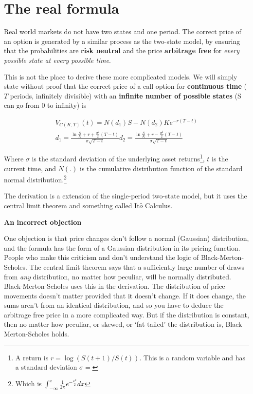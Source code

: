 \section{The real formula}

Real world markets do not have two states and one period. The correct price of an option is generated by a similar process as the two-state model, by ensuring that the probabilities are \textbf{risk neutral} and the price \textbf{arbitrage free} for \textit{every possible state at every possible time}. 

This is not the place to derive these more complicated models. We will simply state without proof that the correct price of a call option for \textbf{continuous time} ($T$ periods, infinitely divisible) with an \textbf{infinite number of possible states} (S can go from 0 to infinity) is

\begin{eqnarray}
V_{C(K,T)}(t) = N(d_1)S - N(d_2)Ke^{-r(T-t)}\\
d_1 = \frac{\ln \frac{S}{K} + r+\frac{\sigma^2}{2}(T-t)}{\sigma \sqrt{T-t}}
d_2 = \frac{\ln \frac{S}{K} + r-\frac{\sigma^2}{2}(T-t)}{\sigma \sqrt{T-t}}
\end{eqnarray}

Where $\sigma$ is the standard deviation of the underlying asset returns\footnote{A return is $r=\log(S(t+1)/S(t))$. This is a random variable and has a standard deviation $\sigma = $}, $t$ is the current time, and $N(.)$ is the cumulative distribution function of the standard normal distribution.\footnote{Which is $\int_{-\infty}^x \frac{1}{2\pi}e^{-\frac{x^2}{2}}dx$}
 
The derivation is a extension of the single-period two-state model, but it uses the central limit theorem and something called It$\hat{o}$ Calculus. 


\textbf{An incorrect objection}

One objection is that price changes don't follow a normal (Gaussian) distribution, and the formula has the form of a Gaussian distribution in its pricing function. People who make this criticism and don't understand the logic of Black-Merton-Scholes. The central limit theorem says that a sufficiently large number of draws from \textit{any} distribution, no matter how peculiar, will be normally distributed. Black-Merton-Scholes uses this in the derivation. The distribution of price movements doesn't matter provided that it doesn't change. If it does change, the sums aren't from an identical distribution, and so you have to deduce the arbitrage free price in a more complicated way. But if the distribution is constant, then no matter how peculiar, or skewed, or `fat-tailed' the distribution is, Black-Merton-Scholes holds.

